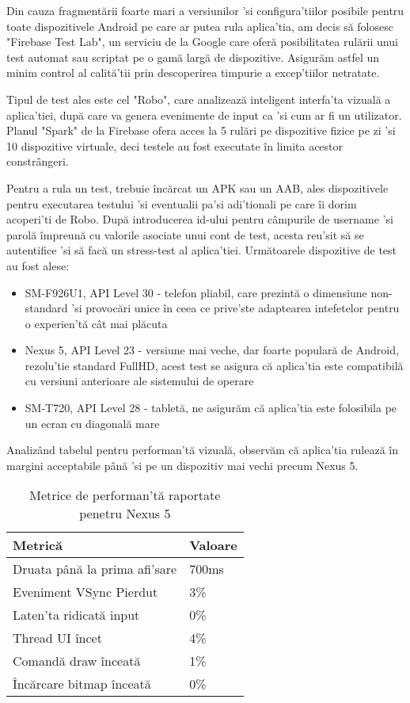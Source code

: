 Din cauza fragmentării foarte mari a versiunilor 'si configura'tiilor posibile pentru toate dispozitivele Android pe care ar putea rula aplica'tia, am decis să folosesc "Firebase Test Lab", un serviciu de la Google care oferă posibilitatea rulării unui test automat sau scriptat pe o gamă largă de dispozitive. 
Asigurăm astfel un minim control al calită'tii prin descoperirea timpurie a excep'tiilor netratate.

Tipul de test ales este cel "Robo", care analizează inteligent interfa'ta vizuală a aplica'tiei, după care va genera evenimente de input ca 'si cum ar fi un utilizator. Planul "Spark" de la Firebase ofera acces la 5 rulări pe dispozitive fizice pe zi 'si 10 dispozitive virtuale, deci testele au fost executate în limita acestor constrângeri. 

Pentru a rula un test, trebuie încărcat un APK sau un AAB, ales dispozitivele pentru executarea testului 'si eventualii pa'si adi'tionali pe care îi dorim acoperi'ti de Robo. După introducerea id-ului pentru câmpurile de username 'si parolă împreună cu valorile asociate unui cont de test, acesta reu'sit să se autentifice 'si să facă un stress-test al aplica'tiei. Următoarele dispozitive de test au fost alese:

\begin{itemize}
  \item SM-F926U1, API Level 30 - telefon pliabil, care prezintă o dimensiune non-standard 'si provocări unice în ceea ce prive'ste adaptearea intefetelor pentru o experien'tă cât mai plăcuta
  \item Nexus 5, API Level 23 - versiune mai veche, dar foarte populară de Android, rezolu'tie standard FullHD, acest test se asigura că aplica'tia este compatibilă cu versiuni anterioare ale sistemului de operare
  \item SM-T720, API Level 28 - tabletă, ne asigurăm că aplica'tia este folosibila pe un ecran cu diagonală mare
\end{itemize}

Analizând tabelul pentru performan'tă vizuală, observăm că aplica'tia rulează în margini acceptabile până 'si pe un dispozitiv mai vechi precum Nexus 5.

\begin{table}[ht!]
\begin{tabular}{ll}
\hline
Metrică &  Valoare \\ 
\hline
\hline
Druata până la prima afi'sare & 700ms \\
Eveniment VSync Pierdut & 3\% \\
Laten'ta ridicată input & 0\% \\
Thread UI încet & 4\% \\
Comandă draw înceată & 1\% \\
Încărcare bitmap înceată & 0\% \\
\hline
\end{tabular}
\centering
\caption{Metrice de performan'tă raportate penetru Nexus 5}
\label{tab:metrics}
\end{table}

